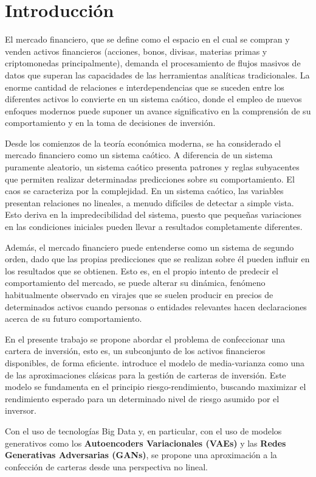 \chapter{Introducción}

El mercado financiero, que se define como el espacio en el cual se compran y venden activos financieros (acciones, bonos, divisas, materias primas y criptomonedas principalmente), demanda el procesamiento de flujos masivos de datos que superan las capacidades de las herramientas analíticas tradicionales. La enorme cantidad de relaciones e interdependencias que se suceden entre los diferentes activos lo convierte en un sistema caótico, donde el empleo de nuevos enfoques modernos puede suponer un avance significativo en la comprensión de su comportamiento y en la toma de decisiones de inversión.

Desde los comienzos de la teoría económica moderna, se ha considerado el mercado financiero como un sistema caótico. A diferencia de un sistema puramente aleatorio, un sistema caótico presenta patrones y reglas subyacentes que permiten realizar determinadas predicciones sobre su comportamiento. El caos se caracteriza por la complejidad. En un sistema caótico, las variables presentan relaciones no lineales, a menudo difíciles de detectar a simple vista. Esto deriva en la impredecibilidad del sistema, puesto que pequeñas variaciones en las condiciones iniciales pueden llevar a resultados completamente diferentes.

Además, el mercado financiero puede entenderse como un sistema de segundo orden, dado que las propias predicciones que se realizan sobre él pueden influir en los resultados que se obtienen. Esto es, en el propio intento de predecir el comportamiento del mercado, se puede alterar su dinámica, fenómeno habitualmente observado en virajes que se suelen producir en precios de determinados activos cuando personas o entidades relevantes hacen declaraciones acerca de su futuro comportamiento.

En el presente trabajo se propone abordar el problema de confeccionar una cartera de inversión, esto es, un subconjunto de los activos financieros disponibles, de forma eficiente. \cite{markowitz1952} introduce el modelo de media-varianza como una de las aproximaciones clásicas para la gestión de carteras de inversión. Este modelo se fundamenta en el principio riesgo-rendimiento, buscando maximizar el rendimiento esperado para un determinado nivel de riesgo asumido por el inversor.

Con el uso de tecnologías Big Data y, en particular, con el uso de modelos generativos como los \textbf{Autoencoders Variacionales (VAEs)} y las \textbf{Redes Generativas Adversarias (GANs)}, se propone una aproximación a la confección de carteras desde una perspectiva no lineal.


